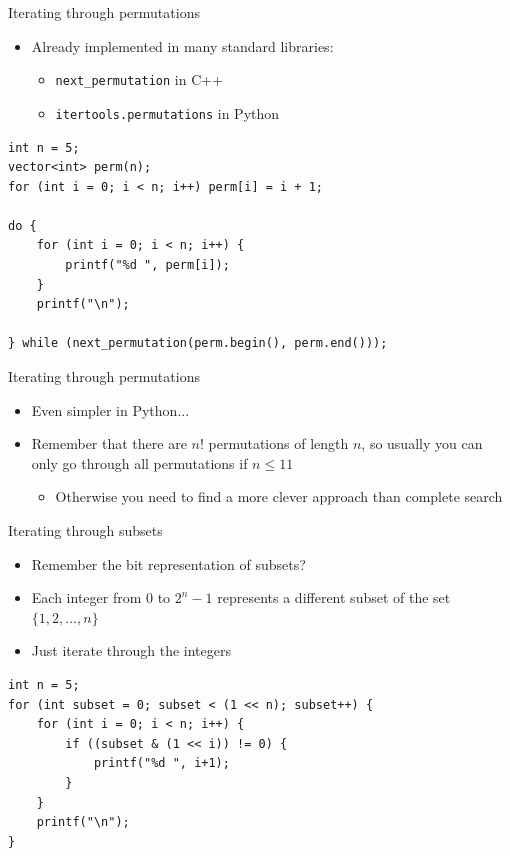 \documentclass[10pt]{beamer}
\newcommand{\bi}{\begin{itemize}}
\newcommand{\ei}{\end{itemize}}
\begin{document}
\begin{frame}[fragile]{Iterating through permutations}
    \bi
        \item Already implemented in many standard libraries:
            \bi
                \item \texttt{next\_{}permutation} in C++
                \item \texttt{itertools.permutations} in Python
            \ei
    \ei

            \begin{verbatim}
int n = 5;
vector<int> perm(n);
for (int i = 0; i < n; i++) perm[i] = i + 1;

do {
    for (int i = 0; i < n; i++) {
        printf("%d ", perm[i]);
    }
    printf("\n");

} while (next_permutation(perm.begin(), perm.end()));
            \end{verbatim}

\end{frame}

\begin{frame}{Iterating through permutations}
    \bi
        \item Even simpler in Python...
        \vspace{20pt}
        \item Remember that there are $n!$ permutations of length $n$, so usually you can only go through all permutations if $n \leq 11$
            \bi
                \item Otherwise you need to find a more clever approach than complete search
            \ei
            \vspace{20pt}
    \ei
\end{frame}


\begin{frame}[fragile]{Iterating through subsets}
    \bi
        \item Remember the bit representation of subsets?
        \item Each integer from $0$ to $2^n - 1$ represents a different subset of the set $\{1,2,\ldots,n\}$
        \item Just iterate through the integers
    \ei

            \begin{verbatim}
int n = 5;
for (int subset = 0; subset < (1 << n); subset++) {
    for (int i = 0; i < n; i++) {
        if ((subset & (1 << i)) != 0) {
            printf("%d ", i+1);
        }
    }
    printf("\n");
}
            \end{verbatim}
\end{frame}
\end{document}
